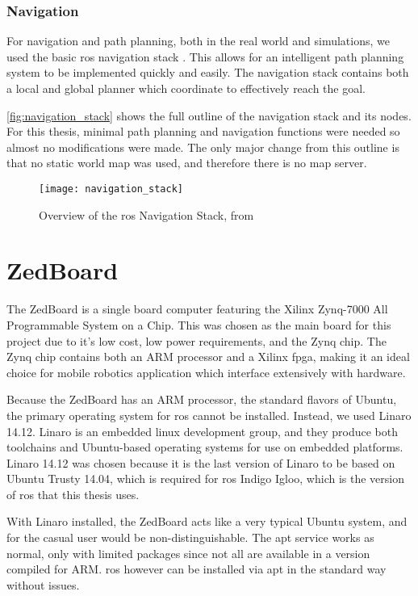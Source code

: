 \documentclass[thesis.tex]{subfile}
\begin{document}
\subsubsection{Navigation}
For navigation and path planning, both in the real world and simulations, we used the basic \gls{ros} navigation stack \cite{ros_navigation}. This allows for an intelligent path planning system to be implemented quickly and easily. The navigation stack contains both a local and global planner which coordinate to effectively reach the goal. 

\autoref{fig:navigation_stack} shows the full outline of the navigation stack and its nodes. For this thesis, minimal path planning and navigation functions were needed so almost no modifications were made. The only major change from this outline is that no static world map was used, and therefore there is no map server.

\begin{figure}
\texttt{[image: navigation\_stack]}
\caption[Overview of the \gls{ros} Navigation Stack]{Overview of the \gls{ros} Navigation Stack, from~\cite{NavigationStack}}
\label{fig:navigation_stack}
\end{figure}

\section{ZedBoard}
The ZedBoard is a single board computer featuring the Xilinx Zynq-7000 All Programmable System on a Chip. This was chosen as the main board for this project due to it's low cost, low power requirements, and the Zynq chip. The Zynq chip contains both an ARM processor and a Xilinx \gls{fpga}, making it an ideal choice for mobile robotics application which interface extensively with hardware.
 
Because the ZedBoard has an ARM processor, the standard flavors of Ubuntu, the primary operating system for \gls{ros} cannot be installed. Instead, we used Linaro 14.12. Linaro is an embedded linux development group, and they produce both toolchains and Ubuntu-based operating systems for use on embedded platforms. Linaro 14.12 was chosen because it is the last version of Linaro to be based on Ubuntu Trusty 14.04, which is required for \gls{ros} Indigo Igloo, which is the version of \gls{ros} that this thesis uses.

With Linaro installed, the ZedBoard acts like a very typical Ubuntu system, and for the casual user would be non-distinguishable. The apt service works as normal, only with limited packages since not all are available in a version compiled for ARM. \gls{ros} however can be installed via apt in the standard way without issues.
\end{document}
